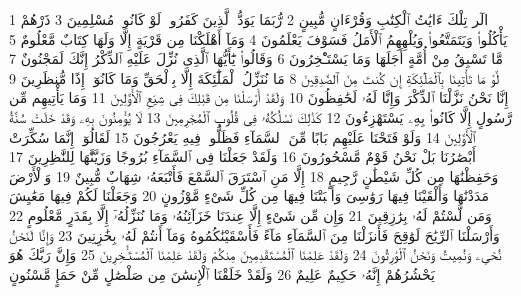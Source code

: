 {\tiny\colorbox{cl_aya}{1}} الٓر تِلْكَ ءَايَٰتُ ٱلْكِتَٰبِ وَقُرْءَانٍ مُّبِينٍ
{\tiny\colorbox{cl_aya}{2}} رُّبَمَا يَوَدُّ ٱلَّذِينَ كَفَرُوا۟ لَوْ كَانُوا۟ مُسْلِمِينَ
{\tiny\colorbox{cl_aya}{3}} ذَرْهُمْ يَأْكُلُوا۟ وَيَتَمَتَّعُوا۟ وَيُلْهِهِمُ ٱلْأَمَلُ فَسَوْفَ يَعْلَمُونَ
{\tiny\colorbox{cl_aya}{4}} وَمَآ أَهْلَكْنَا مِن قَرْيَةٍ إِلَّا وَلَهَا كِتَابٌ مَّعْلُومٌ
{\tiny\colorbox{cl_aya}{5}} مَّا تَسْبِقُ مِنْ أُمَّةٍ أَجَلَهَا وَمَا يَسْتَـْٔخِرُونَ
{\tiny\colorbox{cl_aya}{6}} وَقَالُوا۟ يَٰٓأَيُّهَا ٱلَّذِى نُزِّلَ عَلَيْهِ ٱلذِّكْرُ إِنَّكَ لَمَجْنُونٌ
{\tiny\colorbox{cl_aya}{7}} لَّوْ مَا تَأْتِينَا بِٱلْمَلَٰٓئِكَةِ إِن كُنتَ مِنَ ٱلصَّٰدِقِينَ
{\tiny\colorbox{cl_aya}{8}} مَا نُنَزِّلُ ٱلْمَلَٰٓئِكَةَ إِلَّا بِٱلْحَقِّ وَمَا كَانُوٓا۟ إِذًا مُّنظَرِينَ
{\tiny\colorbox{cl_aya}{9}} إِنَّا نَحْنُ نَزَّلْنَا ٱلذِّكْرَ وَإِنَّا لَهُۥ لَحَٰفِظُونَ
{\tiny\colorbox{cl_aya}{10}} وَلَقَدْ أَرْسَلْنَا مِن قَبْلِكَ فِى شِيَعِ ٱلْأَوَّلِينَ
{\tiny\colorbox{cl_aya}{11}} وَمَا يَأْتِيهِم مِّن رَّسُولٍ إِلَّا كَانُوا۟ بِهِۦ يَسْتَهْزِءُونَ
{\tiny\colorbox{cl_aya}{12}} كَذَٰلِكَ نَسْلُكُهُۥ فِى قُلُوبِ ٱلْمُجْرِمِينَ
{\tiny\colorbox{cl_aya}{13}} لَا يُؤْمِنُونَ بِهِۦ وَقَدْ خَلَتْ سُنَّةُ ٱلْأَوَّلِينَ
{\tiny\colorbox{cl_aya}{14}} وَلَوْ فَتَحْنَا عَلَيْهِم بَابًا مِّنَ ٱلسَّمَآءِ فَظَلُّوا۟ فِيهِ يَعْرُجُونَ
{\tiny\colorbox{cl_aya}{15}} لَقَالُوٓا۟ إِنَّمَا سُكِّرَتْ أَبْصَٰرُنَا بَلْ نَحْنُ قَوْمٌ مَّسْحُورُونَ
{\tiny\colorbox{cl_aya}{16}} وَلَقَدْ جَعَلْنَا فِى ٱلسَّمَآءِ بُرُوجًا وَزَيَّنَّٰهَا لِلنَّٰظِرِينَ
{\tiny\colorbox{cl_aya}{17}} وَحَفِظْنَٰهَا مِن كُلِّ شَيْطَٰنٍ رَّجِيمٍ
{\tiny\colorbox{cl_aya}{18}} إِلَّا مَنِ ٱسْتَرَقَ ٱلسَّمْعَ فَأَتْبَعَهُۥ شِهَابٌ مُّبِينٌ
{\tiny\colorbox{cl_aya}{19}} وَٱلْأَرْضَ مَدَدْنَٰهَا وَأَلْقَيْنَا فِيهَا رَوَٰسِىَ وَأَنۢبَتْنَا فِيهَا مِن كُلِّ شَىْءٍ مَّوْزُونٍ
{\tiny\colorbox{cl_aya}{20}} وَجَعَلْنَا لَكُمْ فِيهَا مَعَٰيِشَ وَمَن لَّسْتُمْ لَهُۥ بِرَٰزِقِينَ
{\tiny\colorbox{cl_aya}{21}} وَإِن مِّن شَىْءٍ إِلَّا عِندَنَا خَزَآئِنُهُۥ وَمَا نُنَزِّلُهُۥٓ إِلَّا بِقَدَرٍ مَّعْلُومٍ
{\tiny\colorbox{cl_aya}{22}} وَأَرْسَلْنَا ٱلرِّيَٰحَ لَوَٰقِحَ فَأَنزَلْنَا مِنَ ٱلسَّمَآءِ مَآءً فَأَسْقَيْنَٰكُمُوهُ وَمَآ أَنتُمْ لَهُۥ بِخَٰزِنِينَ
{\tiny\colorbox{cl_aya}{23}} وَإِنَّا لَنَحْنُ نُحْىِۦ وَنُمِيتُ وَنَحْنُ ٱلْوَٰرِثُونَ
{\tiny\colorbox{cl_aya}{24}} وَلَقَدْ عَلِمْنَا ٱلْمُسْتَقْدِمِينَ مِنكُمْ وَلَقَدْ عَلِمْنَا ٱلْمُسْتَـْٔخِرِينَ
{\tiny\colorbox{cl_aya}{25}} وَإِنَّ رَبَّكَ هُوَ يَحْشُرُهُمْ إِنَّهُۥ حَكِيمٌ عَلِيمٌ
{\tiny\colorbox{cl_aya}{26}} وَلَقَدْ خَلَقْنَا ٱلْإِنسَٰنَ مِن صَلْصَٰلٍ مِّنْ حَمَإٍ مَّسْنُونٍ
